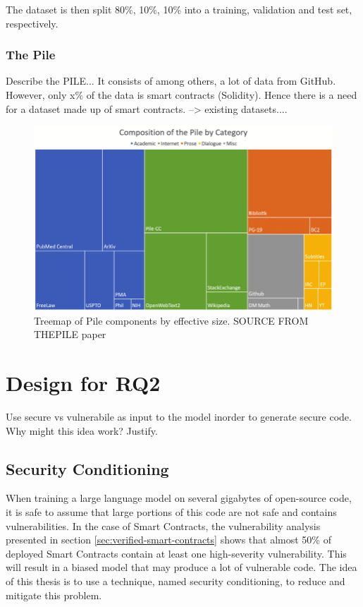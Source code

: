 The dataset is then split 80\%, 10\%, 10\% into a training, validation and test set, respectively.

\subsubsection{The Pile}
\label{sec:the-pile}
Describe the  PILE...  It consists of among others, a lot of data from GitHub. However, only x\% of the data is smart contracts (Solidity). Hence there is a need for a dataset made up of smart contracts. --> existing datasets....

\begin{figure}[htp]
    \centering
    \includegraphics[width=\textwidth]{figures/Treemap-of-Pile-components-by-effective-size.png}
    \caption{Treemap of Pile components by effective size. SOURCE FROM THEPILE paper}
    \label{fig:flowchart}
\end{figure}


\section{Design for RQ2}
\label{sec:design-for-rq2}
Use secure vs vulnerabile as input to the  model inorder to generate secure code. 
Why might this idea work? Justify.



\subsection{Security Conditioning}
\label{sec:security-conditioning}
When training a large language model on several gigabytes of open-source code, it is safe to assume that large portions of this code are not safe and contains vulnerabilities. In the case of Smart Contracts, the vulnerability analysis presented in section \ref{sec:verified-smart-contracts} shows that almost 50\% of deployed Smart Contracts contain at least one high-severity vulnerability. This will result in a biased model that may produce a lot of vulnerable code. The idea of  this thesis  is to use a technique, named security conditioning, to reduce and mitigate this problem.

